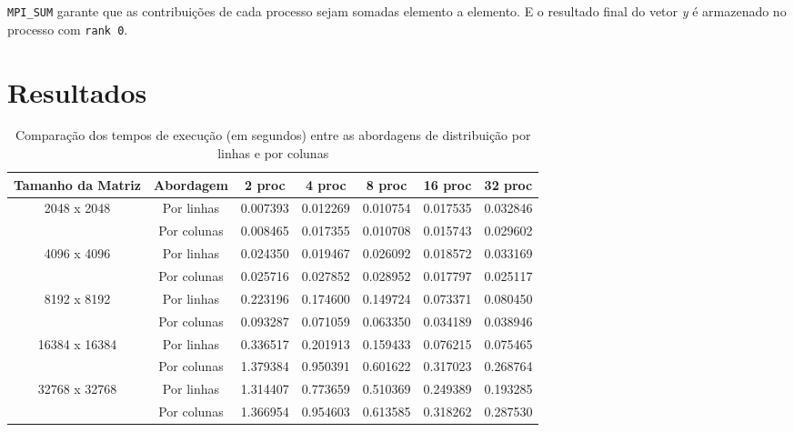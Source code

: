 \documentclass[a4paper, 12pt]{article}
\begin{document}
	\texttt{MPI\_SUM} garante que as contribuições de cada processo sejam somadas elemento a elemento. E o resultado final do vetor \textit{y} é armazenado no processo com \texttt{rank 0}.
	
	\section{Resultados}
	\begin{table}[H]
	\centering
	\begin{tabular}{|c|c|c|c|c|c|c|}
		\hline
		\textbf{Tamanho da Matriz} & \textbf{Abordagem} & \textbf{2 proc} & \textbf{4 proc} & \textbf{8 proc} & \textbf{16 proc} & \textbf{32 proc} \\
		\hline
		\multirow{2}{*}{2048 x 2048} & Por linhas  & 0.007393 & 0.012269 & 0.010754 & 0.017535 & 0.032846 \\
		& Por colunas & 0.008465 & 0.017355 & 0.010708 & 0.015743 & 0.029602 \\
		\hline
		\multirow{2}{*}{4096 x 4096} & Por linhas  & 0.024350 & 0.019467 & 0.026092 & 0.018572 & 0.033169 \\
		& Por colunas & 0.025716 & 0.027852 & 0.028952 & 0.017797 & 0.025117 \\
		\hline
		\multirow{2}{*}{8192 x 8192} & Por linhas  & 0.223196 & 0.174600 & 0.149724 & 0.073371 & 0.080450 \\
		& Por colunas & 0.093287 & 0.071059 & 0.063350 & 0.034189 & 0.038946 \\
		\hline
		\multirow{2}{*}{16384 x 16384} & Por linhas  & 0.336517 & 0.201913 & 0.159433 & 0.076215 & 0.075465 \\
		& Por colunas & 1.379384 & 0.950391 & 0.601622 & 0.317023 & 0.268764 \\
		\hline
		\multirow{2}{*}{32768 x 32768} & Por linhas  & 1.314407 & 0.773659 & 0.510369 & 0.249389 & 0.193285 \\
		& Por colunas & 1.366954 & 0.954603 & 0.613585 & 0.318262 & 0.287530 \\
		\hline
		\end{tabular}
		\caption{Comparação dos tempos de execução (em segundos) entre as abordagens de distribuição por linhas e por colunas}
		\label{tab:comparacao}
	\end{table}
\end{document}
